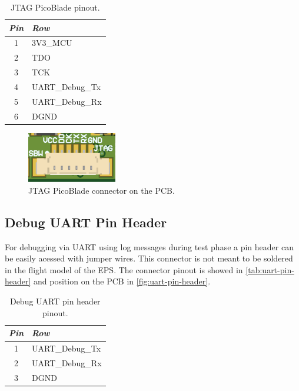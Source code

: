 \begin{table}[!h]
    \centering
    \begin{tabular}{cl}
        \toprule[1.5pt]
        \textit{Pin} & \textit{Row} \\
        \midrule
        1            & 3V3\_MCU \\
        2            & TDO \\
        3            & TCK \\
        4            & UART\_Debug\_Tx \\
        5            & UART\_Debug\_Rx \\
        6            & DGND \\
        \bottomrule[1.5pt]
    \end{tabular}
    \caption{JTAG PicoBlade pinout.}
    \label{tab:jtag-picoblade}
\end{table}

\begin{figure}[!ht]
    \begin{center}
        \includegraphics[width=0.35\textwidth]{figures/jtag-picoblade-3d.png}
        \caption{JTAG PicoBlade connector on the PCB.}
        \label{fig:jtag-picoblade}
    \end{center}
\end{figure}

\subsection{Debug UART Pin Header} \label{uart-pin-header}

For debugging via UART using log messages during test phase a pin header can be easily acessed with jumper wires. This connector is not meant to be soldered in the flight model of the EPS. The connector pinout is showed in \autoref{tab:uart-pin-header} and position on the PCB in \autoref{fig:uart-pin-header}.

\begin{table}[!h]
    \centering
    \begin{tabular}{cl}
        \toprule[1.5pt]
        \textit{Pin} & \textit{Row} \\
        \midrule
        1            & UART\_Debug\_Tx \\
        2            & UART\_Debug\_Rx \\
        3            &  DGND \\
        \bottomrule[1.5pt]
    \end{tabular}
    \caption{Debug UART pin header pinout.}
    \label{tab:uart-pin-header}
\end{table}

